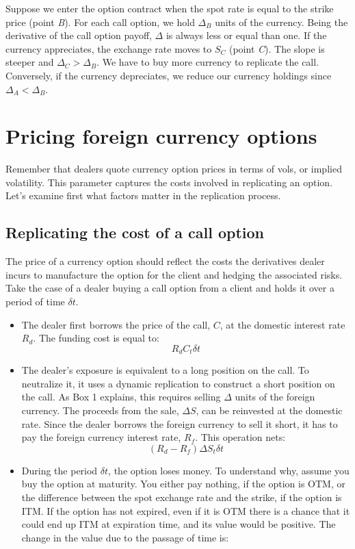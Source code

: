 \documentclass[]{book}
\theoremstyle{definition}
\theoremstyle{definition}
\theoremstyle{definition}
\theoremstyle{remark}
\begin{document}
Suppose we enter the option contract when the spot rate is equal to the
strike price (point \emph{B}). For each call option, we hold
\(\Delta_B\) units of the currency. Being the derivative of the call
option payoff, \(\Delta\) is always less or equal than one. If the
currency appreciates, the exchange rate moves to \(S_C\) (point
\emph{C}). The slope is steeper and \(\Delta_C > \Delta_B\). We have to
buy more currency to replicate the call. Conversely, if the currency
depreciates, we reduce our currency holdings since
\(\Delta_A < \Delta_B\).

\section{Pricing foreign currency
options}\label{pricing-foreign-currency-options}

Remember that dealers quote currency option prices in terms of vols, or
implied volatility. This parameter captures the costs involved in
replicating an option. Let's examine first what factors matter in the
replication process.

\subsection{Replicating the cost of a call
option}\label{replicating-the-cost-of-a-call-option}

The price of a currency option should reflect the costs the derivatives
dealer incurs to manufacture the option for the client and hedging the
associated risks. Take the case of a dealer buying a call option from a
client and holds it over a period of time \(\delta t\).

\begin{itemize}
\item
  The dealer first borrows the price of the call, \(C\), at the domestic
  interest rate \(R_d\). The funding cost is equal to: \[
  R_d C_t \delta t
  \]
\item
  The dealer's exposure is equivalent to a long position on the call. To
  neutralize it, it uses a dynamic replication to construct a short
  position on the call. As Box 1 explains, this requires selling
  \(\Delta\) units of the foreign currency. The proceeds from the sale,
  \(\Delta S\), can be reinvested at the domestic rate. Since the dealer
  borrows the foreign currency to sell it short, it has to pay the
  foreign currency interest rate, \(R_f\). This operation nets: \[
  (R_d - R_f) \Delta S_t  \delta t
  \]
\item
  During the period \(\delta t\), the option loses money. To understand
  why, assume you buy the option at maturity. You either pay nothing, if
  the option is OTM, or the difference between the spot exchange rate
  and the strike, if the option is ITM. If the option has not expired,
  even if it is OTM there is a chance that it could end up ITM at
  expiration time, and its value would be positive. The change in the
  value due to the passage of time is:
\end{itemize}
\end{document}
